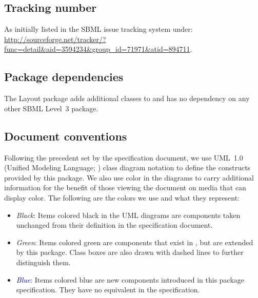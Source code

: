 \subsection{Tracking number}
As initially listed in the SBML issue tracking system under: \\
\url{http://sourceforge.net/tracker/?func=detail&aid=3594234&group_id=71971&atid=894711}.

\subsection{Package dependencies}

The Layout package adds additional classes to \sbmlthreecore and has no 
dependency on any other SBML Level~3 package.


\subsection{Document conventions}

\label{conventions}

Following the precedent set by the \sbmlthreecore specification
document, we use UML~1.0 (Unified Modeling Language;
\citealt{eriksson:1998,oestereich:1999}) class diagram notation to
define the constructs provided by this package.  We also use color in
the diagrams to carry additional information for the benefit of those
viewing the document on media that can display color.  The following are
the colors we use and what they represent:

\begin{itemize}

\item[\raisebox{2.75pt}{\colorbox{black}{\rule{0.8pt}{0.8pt}}}]
  \emph{Black}: Items colored black in the UML diagrams are components
  taken unchanged from their definition in the \sbmlthreecore
  specification document.

\item[\raisebox{2.75pt}{\colorbox{mediumgreen}{\rule{0.8pt}{0.8pt}}}]
  \emph{\textcolor{mediumgreen}{Green}}: Items colored green are
  components that exist in \sbmlthreecore, but are extended by this
  package.  Class boxes are also drawn with dashed lines to further
  distinguish them.

\item[\raisebox{2.75pt}{\colorbox{darkblue}{\rule{0.8pt}{0.8pt}}}]
  \emph{\textcolor{darkblue}{Blue}}: Items colored blue are new
  components introduced in this package specification.  They have no
  equivalent in the \sbmlthreecore specification.

\end{itemize}

